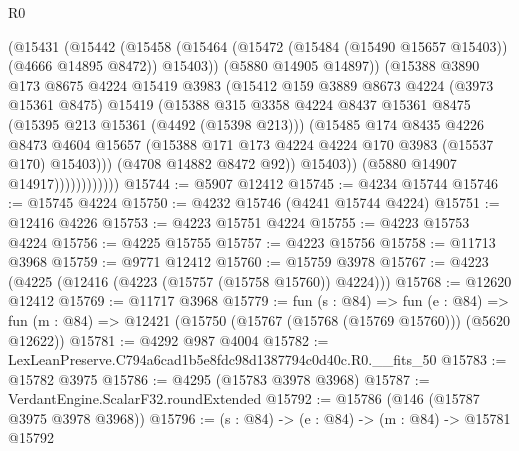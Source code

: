 \begin{lexlean}{R0}
\begin{coremodule}
                          (@15431
                            (@15442
                              (@15458
                                (@15464
                                  (@15472 (@15484 (@15490 @15657 @15403)) (@4666 @14895 @8472))
                                  @15403))
                              (@5880 @14905 @14897))
                            (@15388
                              @3890
                              @173
                              @8675
                              @4224
                              @15419
                              @3983
                              (@15412
                                @159
                                @3889
                                @8673
                                @4224
                                (@3973 @15361 @8475)
                                @15419
                                (@15388
                                  @315
                                  @3358
                                  @4224
                                  @8437
                                  @15361
                                  @8475
                                  (@15395 @213 @15361 (@4492 (@15398 @213)))
                                  (@15485
                                    @174
                                    @8435
                                    @4226
                                    @8473
                                    @4604
                                    @15657
                                    (@15388 @171 @173 @4224 @4224 @170 @3983 (@15537 @170) @15403)))
                                (@4708 @14882 @8472 @92))
                              @15403))
                          (@5880 @14907 @14917))))))))))))
@15744 := @5907 @12412
@15745 := @4234 @15744
@15746 := @15745 @4224
@15750 := @4232 @15746 (@4241 @15744 @4224)
@15751 := @12416 @4226
@15753 := @4223 @15751 @4224
@15755 := @4223 @15753 @4224
@15756 := @4225 @15755
@15757 := @4223 @15756
@15758 := @11713 @3968
@15759 := @9771 @12412
@15760 := @15759 @3978
@15767 := @4223 (@4225 (@12416 (@4223 (@15757 (@15758 @15760)) @4224)))
@15768 := @12620 @12412
@15769 := @11717 @3968
@15779 := fun (s : @84) =>
  fun (e : @84) => fun (m : @84) => @12421 (@15750 (@15767 (@15768 (@15769 @15760))) (@5620 @12622))
@15781 := @4292 @987 @4004
@15782 := LexLeanPreserve.C794a6cad1b5e8fdc98d1387794c0d40c.R0.__fits_50
@15783 := @15782 @3975
@15786 := @4295 (@15783 @3978 @3968)
@15787 := VerdantEngine.ScalarF32.roundExtended
@15792 := @15786 (@146 (@15787 @3975 @3978 @3968))
@15796 := (s : @84) -> (e : @84) -> (m : @84) -> @15781 @15792

\end{coremodule}
\end{lexlean}
